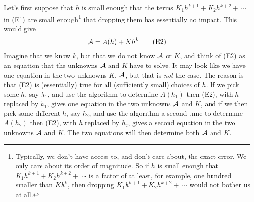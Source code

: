 Let's first suppose that $h$ is small enough that the terms
$K_1h^{k+1}+K_2h^{k+2}+\ \cdots$ in (E1) are small enough\footnote{Typically, we don't have access to, and don't care about, the exact error. We only care about its order of magnitude. So if $h$ is small enough that $K_1h^{k+1}+K_2h^{k+2}+\ \cdots$ is a factor of at least, for example, one hundred smaller than $Kh^k$, then dropping $K_1h^{k+1}+K_2h^{k+2}+\ \cdots$ would not bother us at all.} that dropping them has essentially no impact.
This would give
\begin{equation*}
\mathcal{A}=A(h)+Kh^k
\tag{E2}\end{equation*}
Imagine that we know $k$, but that we do not know $\mathcal{A}$ or $K$,
and think of (E2) as an equation that
the unknowns $\mathcal{A}$ and $K$ have to solve. It may look like we have
one equation in the two unknowns $K$, $\mathcal{A}$, but that is \emph{not}
the case.
The reason is that (E2) is (essentially) true for
all (sufficiently small) choices of $h$.
If we pick some $h$, say $h_1$, and use the algorithm to determine $A(h_1)$
then (E2), with $h$ replaced by $h_1$, gives
one equation in the two unknowns $\mathcal{A}$ and $K$, and if we then
pick some
different $h$, say $h_2$, and use the algorithm a second time
to determine $A(h_2)$
then (E2), with $h$ replaced by $h_2$, gives a
second equation in the two unknowns $\mathcal{A}$ and $K$. The two equations will
then determine both $\mathcal{A}$ and $K$.

